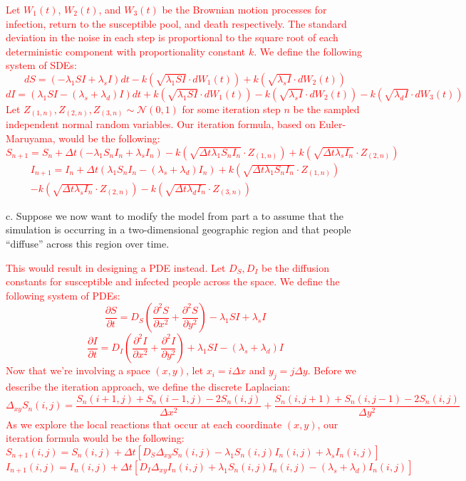 \documentclass[11pt]{article}
\begin{document}
\textcolor{red}{
Let $W_1(t)$, $W_2(t)$, and $W_3(t)$ be the Brownian motion processes for infection, return to the susceptible pool, and death respectively. The standard deviation in the noise in each step is proportional to the square root of each deterministic component with proportionality constant $k$. We define the following system of SDEs:
\[dS = \left(-\lambda_1 S I + \lambda_s I\right)dt - k\left(\sqrt{\lambda_1 S I} \cdot dW_1(t)\right) + k\left(\sqrt{\lambda_s I} \cdot dW_2(t)\right)\]
\[dI = \left(\lambda_1 S I - (\lambda_s + \lambda_d) I\right)dt + k\left(\sqrt{\lambda_1 S I} \cdot dW_1(t)\right) - k\left(\sqrt{\lambda_s I} \cdot dW_2(t)\right) - k\left(\sqrt{\lambda_d I} \cdot dW_3(t)\right)\]
Let $Z_{(1,n)}, Z_{(2,n)}, Z_{(3,n)} \sim \mathcal{N}(0, 1)$ for some iteration step $n$ be the sampled independent normal random variables. Our iteration formula, based on Euler-Maruyama, would be the following:
\[S_{n+1} = S_n + \Delta t \left(-\lambda_1 S_n I_n + \lambda_s I_n\right) - k\left(\sqrt{\Delta t \lambda_1 S_n I_n} \cdot Z_{(1,n)}\right) + k\left(\sqrt{\Delta t \lambda_s I_n} \cdot Z_{(2,n)}\right)\]
\begin{multline*}I_{n+1} = I_n + \Delta t \left(\lambda_1 S_n I_n - (\lambda_s + \lambda_d) I_n\right) + k\left(\sqrt{\Delta t \lambda_1 S_n I_n} \cdot Z_{(1,n)}\right)\\ - k\left(\sqrt{\Delta t \lambda_s I_n} \cdot Z_{(2,n)}\right) - k\left(\sqrt{\Delta t \lambda_d I_n} \cdot Z_{(3,n)}\right)\end{multline*}
}

c. Suppose we now want to modify the model from part a to assume that the simulation is occurring in a two-dimensional geographic region and that people ``diffuse'' across this region over time.

\textcolor{red}{
This would result in designing a PDE instead. Let $D_S, D_I$ be the diffusion constants for susceptible and infected people across the space. We define the following system of PDEs:
\[\frac{\partial S}{\partial t} = D_S \left(\frac{\partial^2 S}{\partial x^2} + \frac{\partial^2 S}{\partial y^2}\right) - \lambda_1 S I + \lambda_s I\]
\[\frac{\partial I}{\partial t} = D_I \left(\frac{\partial^2 I}{\partial x^2} + \frac{\partial^2 I}{\partial y^2}\right) + \lambda_1 S I - (\lambda_s + \lambda_d) I\]
Now that we're involving a space $(x,y)$, let $x_i = i\Delta x$ and $y_j = j\Delta y$. Before we describe the iteration approach, we define the discrete Laplacian:
\[\Delta_{xy} S_n(i, j) = \frac{S_n(i+1,j) + S_n(i-1,j) - 2S_n(i,j)}{\Delta x^2} + \frac{S_n(i,j+1) + S_n(i,j-1) - 2S_n(i,j)}{\Delta y^2}\]
As we explore the local reactions that occur at each coordinate $(x,y)$, our iteration formula would be the following:
\[S_{n+1}(i,j) = S_n(i,j) + \Delta t \left[ D_S \Delta_{xy} S_n(i,j) - \lambda_1 S_n(i,j) I_n(i,j) + \lambda_s I_n(i,j) \right]\]
\[I_{n+1}(i,j) = I_n(i,j) + \Delta t \left[ D_I \Delta_{xy} I_n(i,j) + \lambda_1 S_n(i,j) I_n(i,j) - (\lambda_s + \lambda_d) I_n(i,j) \right]\]
}
\end{document}
